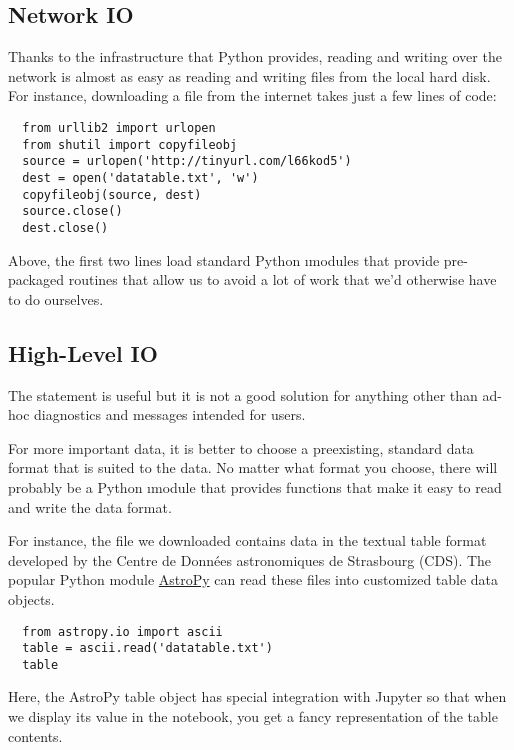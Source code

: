 \documentclass[letterpaper, 12pt, titlepage, twoside]{article}
\begin{document}
\subsection*{Network IO}

Thanks to the infrastructure that Python provides, reading and writing over
the network is almost as easy as reading and writing files from the local hard
disk. For instance, downloading a file from the internet takes just a few
lines of code:

\begin{lstlisting}
  from urllib2 import urlopen
  from shutil import copyfileobj
  source = urlopen('http://tinyurl.com/l66kod5')
  dest = open('datatable.txt', 'w')
  copyfileobj(source, dest)
  source.close()
  dest.close()
\end{lstlisting}

Above, the first two lines load standard Python \i{modules} that provide
pre-packaged routines that allow us to avoid a lot of work that we'd otherwise
have to do ourselves.

\subsection*{High-Level IO}

The  statement is useful but it is not a good solution for anything
other than ad-hoc diagnostics and messages intended for users.

For more important data, it is better to choose a preexisting, standard data
format that is suited to the data. No matter what format you choose, there
will probably be a Python \i{module} that provides functions that make it easy
to read and write the data format.

For instance, the file we downloaded contains data in the textual table format
developed by the Centre de Données astronomiques de Strasbourg (CDS). The
popular Python module \href{http://www.astropy.org/}{AstroPy} can read these
files into customized table data objects.

\begin{lstlisting}
  from astropy.io import ascii
  table = ascii.read('datatable.txt')
  table
\end{lstlisting}

Here, the AstroPy table object has special integration with Jupyter so that
when we display its value in the notebook, you get a fancy representation of
the table contents.
\end{document}
